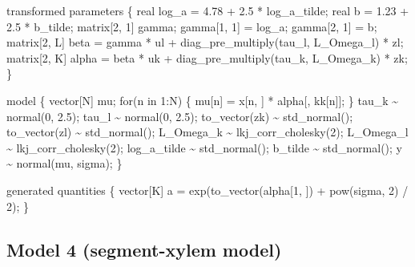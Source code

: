 \documentclass[
  12pt,
  letterpaper,
  DIV=11,
  numbers=noendperiod]{scrartcl}
\newenvironment{Shaded}{\begin{snugshade}}{\end{snugshade}}
\newcommand{\ControlFlowTok}[1]{\textcolor[rgb]{0.00,0.23,0.31}{#1}}
\newcommand{\DataTypeTok}[1]{\textcolor[rgb]{0.68,0.00,0.00}{#1}}
\newcommand{\DecValTok}[1]{\textcolor[rgb]{0.68,0.00,0.00}{#1}}
\newcommand{\FloatTok}[1]{\textcolor[rgb]{0.68,0.00,0.00}{#1}}
\newcommand{\KeywordTok}[1]{\textcolor[rgb]{0.00,0.23,0.31}{#1}}
\newcommand{\NormalTok}[1]{\textcolor[rgb]{0.00,0.23,0.31}{#1}}
\begin{document}
\begin{Shaded}
\begin{Highlighting}[]
\KeywordTok{transformed parameters}\NormalTok{ \{}
  \DataTypeTok{real}\NormalTok{ log\_a = }\FloatTok{4.78}\NormalTok{ + }\FloatTok{2.5}\NormalTok{ * log\_a\_tilde;}
  \DataTypeTok{real}\NormalTok{ b = }\FloatTok{1.23}\NormalTok{ + }\FloatTok{2.5}\NormalTok{ * b\_tilde;}
  \DataTypeTok{matrix}\NormalTok{[}\DecValTok{2}\NormalTok{, }\DecValTok{1}\NormalTok{] gamma;}
\NormalTok{  gamma[}\DecValTok{1}\NormalTok{, }\DecValTok{1}\NormalTok{] = log\_a;}
\NormalTok{  gamma[}\DecValTok{2}\NormalTok{, }\DecValTok{1}\NormalTok{] = b;}
  \DataTypeTok{matrix}\NormalTok{[}\DecValTok{2}\NormalTok{, L] beta = gamma * ul + diag\_pre\_multiply(tau\_l, L\_Omega\_l) * zl;}
  \DataTypeTok{matrix}\NormalTok{[}\DecValTok{2}\NormalTok{, K] alpha = beta * uk + diag\_pre\_multiply(tau\_k, L\_Omega\_k) * zk;}
\NormalTok{\}}

\KeywordTok{model}\NormalTok{ \{}
 \DataTypeTok{vector}\NormalTok{[N] mu;}
  \ControlFlowTok{for}\NormalTok{(n }\ControlFlowTok{in} \DecValTok{1}\NormalTok{:N) \{}
\NormalTok{    mu[n] = x[n, ] * alpha[, kk[n]];}
\NormalTok{  \}}
\NormalTok{  tau\_k \textasciitilde{} normal(}\DecValTok{0}\NormalTok{, }\FloatTok{2.5}\NormalTok{);}
\NormalTok{  tau\_l \textasciitilde{} normal(}\DecValTok{0}\NormalTok{, }\FloatTok{2.5}\NormalTok{);}
\NormalTok{  to\_vector(zk) \textasciitilde{} std\_normal();}
\NormalTok{  to\_vector(zl) \textasciitilde{} std\_normal();}
\NormalTok{  L\_Omega\_k \textasciitilde{} lkj\_corr\_cholesky(}\DecValTok{2}\NormalTok{);}
\NormalTok{  L\_Omega\_l \textasciitilde{} lkj\_corr\_cholesky(}\DecValTok{2}\NormalTok{);}
\NormalTok{  log\_a\_tilde \textasciitilde{} std\_normal();}
\NormalTok{  b\_tilde \textasciitilde{} std\_normal();}
\NormalTok{  y \textasciitilde{} normal(mu, sigma);}
\NormalTok{\}}

\KeywordTok{generated quantities}\NormalTok{ \{}
  \DataTypeTok{vector}\NormalTok{[K] a = exp(to\_vector(alpha[}\DecValTok{1}\NormalTok{, ]) + pow(sigma, }\DecValTok{2}\NormalTok{) / }\DecValTok{2}\NormalTok{);}
\NormalTok{\}}
\end{Highlighting}
\end{Shaded}

\newpage

\subsection{Model 4 (segment-xylem
model)}\label{model-4-segment-xylem-model}
\end{document}
